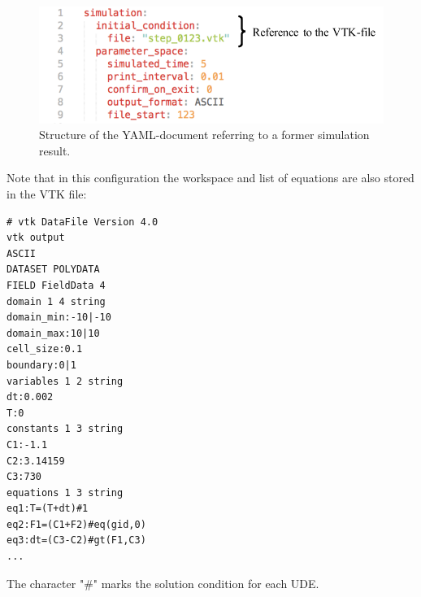 \documentclass[a4paper,12pt,openany]{book}
\theoremstyle{break}
\begin{document}
\begin{figure}[H]
  \includegraphics[scale=1]{yaml_intro_simple.pdf}
  \centering
  \caption{Structure of the YAML-document referring to a former simulation result.}
  \label{fig:yaml_intro_simple}
\end{figure}\vspace*{3pt}
\newpage
Note that in this configuration the workspace and list of equations are also stored in the VTK file:\\
\begin{lstlisting}
# vtk DataFile Version 4.0
vtk output
ASCII
DATASET POLYDATA
FIELD FieldData 4
domain 1 4 string
domain_min:-10|-10
domain_max:10|10
cell_size:0.1
boundary:0|1
variables 1 2 string
dt:0.002
T:0
constants 1 3 string
C1:-1.1
C2:3.14159
C3:730
equations 1 3 string
eq1:T=(T+dt)#1
eq2:F1=(C1+F2)#eq(gid,0)
eq3:dt=(C3-C2)#gt(F1,C3)
...
\end{lstlisting}
The character "\#" marks the solution condition for each UDE.
\end{document}

